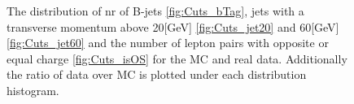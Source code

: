 \documentclass{article}
\begin{document}
\begin{figure}
    \caption{The distribution of nr of B-jets \ref{fig:Cuts_bTag}, jets with a transverse momentum above 20[GeV] \ref{fig:Cuts_jet20}  and 60[GeV] \ref{fig:Cuts_jet60} and the number of lepton pairs with opposite or equal charge \ref{fig:Cuts_isOS} for the MC and real data. Additionally the ratio of data over MC is plotted under each distribution histogram.}
    \label{fig:var2}
\end{figure}
\newpage
\end{document}
